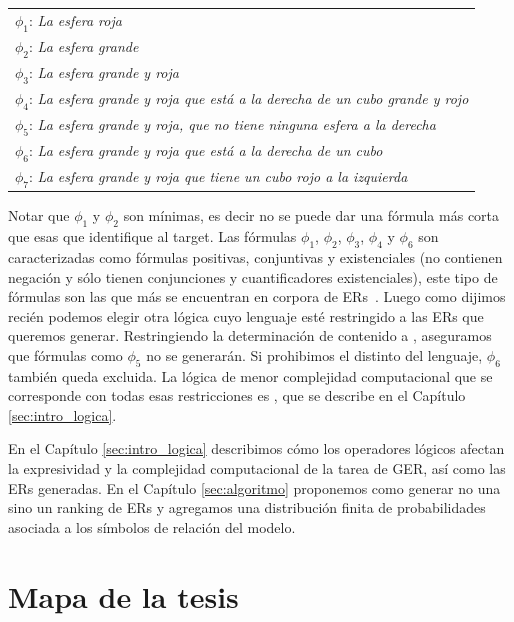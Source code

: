 \begin{tabular}{l}
 $\phi_1$: {\it La esfera roja}\\[1pt]
 $\phi_2$: {\it La esfera grande}\\[1pt]
 $\phi_3$: {\it La esfera grande y roja}\\[1pt]
 $\phi_4$: {\it La esfera grande y roja que est\'a a la derecha de un cubo grande y rojo}\\[1pt]
 $\phi_5$: {\it La esfera grande y roja, que no tiene ninguna esfera a la derecha}\\[1pt]
 $\phi_6$: {\it La esfera grande y roja que est\'a a la derecha de un cubo}\\[1pt]
 $\phi_7$: {\it La esfera grande y roja que tiene un cubo rojo a la izquierda}\\[1pt]
\end{tabular}
\smallskip

Notar que $\phi_1$ y $\phi_2$ son m\'inimas, es decir no se puede dar una f\'ormula m\'as corta que esas que identifique al target.
Las f\'ormulas $\phi_1$, $\phi_2$, $\phi_3$, $\phi_4$ y $\phi_6$ son caracterizadas como f\'ormulas positivas, conjuntivas y existenciales (no contienen negaci\'on y s\'olo tienen conjunciones y cuantificadores existenciales), este tipo de f\'ormulas son las que m\'as se encuentran en corpora de ERs~\cite{viethen06:_algor_for_gener_refer_expres,deemter06:_build_seman_trans_corpus_for,gre3d3}. Luego como dijimos reci\'en podemos elegir otra l\'ogica cuyo lenguaje est\'e restringido a las ERs que queremos generar. Restringiendo la determinaci\'on de contenido a \EPFOL, aseguramos que f\'ormulas como  $\phi_5$ no se generar\'an. Si prohibimos el distinto del lenguaje, $\phi_6$ tambi\'en queda excluida. La l\'ogica de menor complejidad computacional que se corresponde con todas esas restricciones es \EL, que se describe en el Cap\'itulo \ref{sec:intro_logica}. 

En el Cap\'itulo \ref{sec:intro_logica} describimos c\'omo los operadores l\'ogicos afectan la expresividad y la complejidad computacional de la tarea de GER, as\'i como las ERs generadas. En el Cap\'itulo \ref{sec:algoritmo} proponemos como generar no una sino un ranking de ERs y agregamos una distribuci\'on finita de probabilidades asociada a los s\'imbolos de relaci\'on del modelo.



\section{Mapa de la tesis}
\label{sec:mapadetesis}

